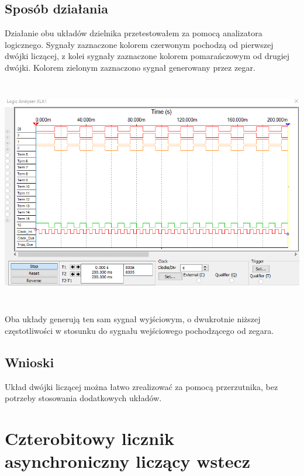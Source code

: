 \documentclass{article}
\begin{document}
        \subsection{Sposób działania}
            Działanie obu układów dzielnika przetestowałem za pomocą analizatora logicznego. Sygnały zaznaczone kolorem czerwonym pochodzą od pierwszej dwójki liczącej, z kolei sygnały zaznaczone kolorem pomarańczowym od drugiej dwójki. Kolorem zielonym zaznaczono sygnał generowany przez zegar. 
            \begin{center}
                \includegraphics[height=10cm]{reports/img/Z3A_2.png}\\
            \end{center}
            Oba układy generują ten sam sygnał wyjściowym, o dwukrotnie niższej częstotliwości w stosunku do sygnału wejściowego pochodzącego od zegara. 
            
        \subsection{Wnioski}
            Układ dwójki liczącej można łatwo zrealizować za pomocą przerzutnika, bez potrzeby stosowania dodatkowych układów.
            
    \section{Czterobitowy licznik asynchroniczny liczący wstecz}
\end{document}
